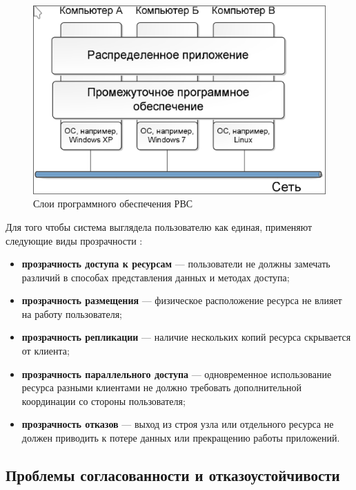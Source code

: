 \begin{figure}
  \centering
  \includegraphics[scale=0.4]{inc/distr-arch.png}
  \caption{Слои программного обеспечения РВС \cite{radchenko2012}}
  \label{fig:distributed-architecture}
\end{figure}

Для того чтобы система выглядела пользователю как единая, применяют следующие
виды прозрачности \cite{radchenko2012}:

\begin{itemize}
    \item \textbf{прозрачность доступа к ресурсам} — пользователи не должны
    замечать различий в способах представления данных и методах доступа;
    \item \textbf{прозрачность размещения} — физическое расположение ресурса не
    влияет на работу пользователя;
    \item \textbf{прозрачность репликации} — наличие нескольких копий ресурса
    скрывается от клиента;
    \item \textbf{прозрачность параллельного доступа} — одновременное
    использование ресурса разными клиентами не должно требовать дополнительной
    координации
    со стороны пользователя;
    \item \textbf{прозрачность отказов} — выход из строя узла или отдельного
    ресурса не должен приводить к потере данных или прекращению работы
    приложений.
\end{itemize}

\subsection{Проблемы согласованности и отказоустойчивости}

